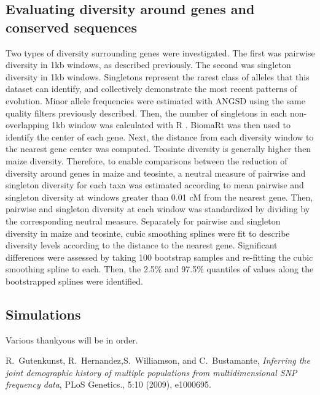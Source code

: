 \documentclass{pnastwo}
\begin{document}
\begin{article}
\begin{materials}
\subsection{Evaluating diversity around genes and conserved sequences}
Two types of diversity surrounding genes were investigated. The first
was pairwise diversity in 1kb windows, as described previously. The
second was singleton diversity in 1kb windows. Singletons represent
the rarest class of alleles that this dataset can identify, and
collectively demonstrate the most recent patterns of evolution. Minor
allele frequencies were estimated with ANGSD \cite{angsd} using the
same quality filters previously described. Then, the number of
singletons in each non-overlapping 1kb window was calculated with R
\cite{R}. BiomaRt \cite{biomaRt1, biomaRt2} was then used to identify
the center of each gene. Next, the distance from each diversity window
to the nearest gene center was computed. Teosinte diversity is
generally higher then maize diversity. Therefore, to enable comparisons between
the reduction of diversity around genes in maize and teosinte, a
neutral measure of pairwise and singleton diversity for each taxa was estimated according to
mean pairwise and singleton diversity at windows greater than 0.01 cM from the nearest
gene. Then, pairwise and singleton diversity at each window was
standardized by dividing by the corresponding neutral
measure. Separately for pairwise and singleton diversity in maize and
teosinte, cubic smoothing splines were fit to
describe diversity levels according to the distance to the nearest
gene. Significant differences were assessed by taking 100 bootstrap
samples and re-fitting the cubic smoothing spline to each. Then, the
2.5\% and 97.5\% quantiles of values along the bootstrapped splines
were identified.

\subsection{Simulations}

\end{materials}

\begin{acknowledgments}
Various thankyous will be in order.
\end{acknowledgments}


\begin{thebibliography}{10}
R.~Gutenkunst, R.~Hernandez,S.~Williamson, and C.~Bustamante, {\em
  Inferring the joint demographic history of multiple populations from
  multidimensional SNP frequency data}, PLoS Genetics., 5:10 (2009), e1000695.


\end{thebibliography}
\end{article}
\end{document}
